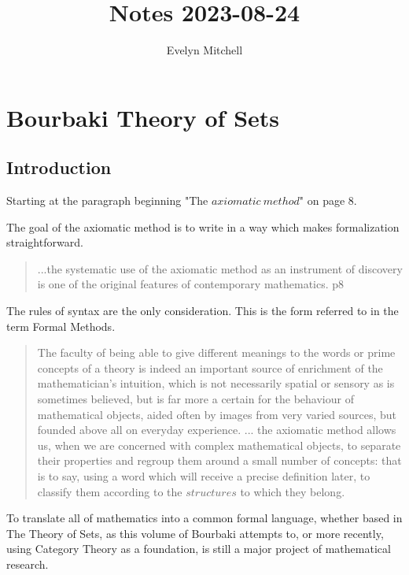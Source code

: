 \documentclass[]{scrartcl}
\title{Notes 2023-08-24}
\author{Evelyn Mitchell}
\begin{document}
\maketitle

\begin{abstract}

\end{abstract}

\section{Bourbaki Theory of Sets}

\subsection{Introduction}

Starting at the paragraph beginning "The $axiomatic\ method$" on page 8.

The goal of the axiomatic method is to write in a way which makes formalization straightforward. 

\begin{quote}
	...{the systematic use of the axiomatic method} as an instrument of discovery is one of the original features of contemporary mathematics. p8
\end{quote}

The rules of syntax are the only consideration. This is the form referred to in the term Formal Methods.

\begin{quote}
	The faculty of being able to give different meanings to the words or prime concepts of a theory is indeed an important source of enrichment of the mathematician's intuition, which is not necessarily spatial or sensory as is sometimes believed, but is far more a certain for the behaviour of mathematical objects, aided often by images from very varied sources, but founded above all on everyday experience. ...
	the axiomatic method allows us, when we are concerned with complex mathematical objects, to separate their properties and regroup them around a small number of concepts: that is to say, using a word which will receive a precise definition later, to classify them according to the $structures$ to which they belong.
	 
\end{quote}

To translate all of mathematics into a common formal language, whether based in The Theory of Sets, as this volume of Bourbaki attempts to, or more recently, using Category Theory as a foundation, is still a major project of mathematical research.
\end{document}
